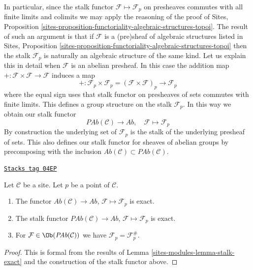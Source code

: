 In particular, since the stalk functor $\mathcal{F} \mapsto \mathcal{F}_p$
on presheaves commutes with all finite limits and colimits we may apply the
reasoning of the proof of
Sites,
Proposition \ref{sites-proposition-functoriality-algebraic-structures-topoi}.
The result of such an argument is that if $\mathcal{F}$ is a
(pre)sheaf of algebraic structures listed in
Sites,
Proposition \ref{sites-proposition-functoriality-algebraic-structures-topoi}
then the stalk $\mathcal{F}_p$ is naturally an algebraic structure
of the same kind. Let us explain this in detail when $\mathcal{F}$
is an abelian presheaf. In this case the addition map
$+ : \mathcal{F} \times \mathcal{F} \to \mathcal{F}$ induces
a map
$$
+ :
\mathcal{F}_p \times \mathcal{F}_p
=
(\mathcal{F} \times \mathcal{F})_p
\longrightarrow
\mathcal{F}_p
$$
where the equal sign uses that stalk functor on presheaves of sets
commutes with finite limits. This defines a group structure on
the stalk $\mathcal{F}_p$. In this way we obtain
our stalk functor
$$
\textit{PAb}(\mathcal{C}) \longrightarrow \textit{Ab}, \quad
\mathcal{F} \longmapsto \mathcal{F}_p
$$
By construction the underlying set of $\mathcal{F}_p$ is the stalk of the
underlying presheaf of sets. This also defines our stalk functor for
sheaves of abelian groups by precomposing with the inclusion
$\textit{Ab}(\mathcal{C}) \subset \textit{PAb}(\mathcal{C})$.

\begin{lemma}
\label{sites-modules-lemma-stalk-exact-abelian}
\href{https://stacks.math.columbia.edu/tag/04EP}{\texttt{Stacks tag 04EP}}

Let $\mathcal{C}$ be a site.
Let $p$ be a point of $\mathcal{C}$.
\begin{enumerate}
\item The functor
$\textit{Ab}(\mathcal{C}) \to \textit{Ab}$,
$\mathcal{F} \mapsto \mathcal{F}_p$ is exact.
\item The stalk functor
$\textit{PAb}(\mathcal{C}) \to \textit{Ab}$,
$\mathcal{F}  \mapsto  \mathcal{F}_p$
is exact.
\item For $\mathcal{F} \in \Ob(\textit{PAb}(\mathcal{C}))$
we have $\mathcal{F}_p = \mathcal{F}^\#_p$.
\end{enumerate}
\end{lemma}

\begin{proof}
This is formal from the results of
Lemma \ref{sites-modules-lemma-stalk-exact}
and the construction of the stalk functor above.
\end{proof}

